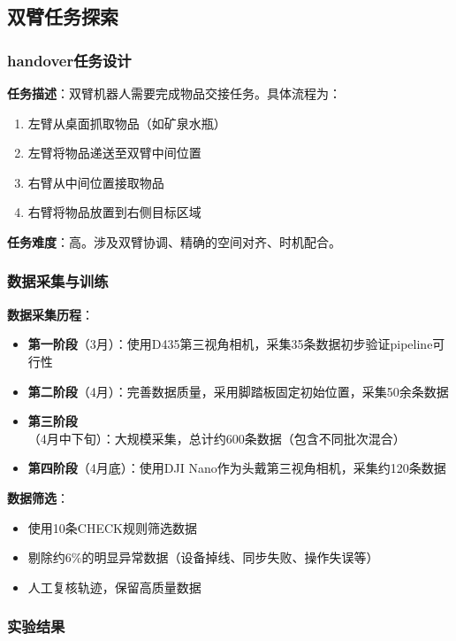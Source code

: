 \subsection{双臂任务探索}

\subsubsection{handover任务设计}

\textbf{任务描述}：双臂机器人需要完成物品交接任务。具体流程为：
\begin{enumerate}[leftmargin=2em]
    \item 左臂从桌面抓取物品（如矿泉水瓶）
    \item 左臂将物品递送至双臂中间位置
    \item 右臂从中间位置接取物品
    \item 右臂将物品放置到右侧目标区域
\end{enumerate}

\textbf{任务难度}：高。涉及双臂协调、精确的空间对齐、时机配合。

\subsubsection{数据采集与训练}

\textbf{数据采集历程}：
\begin{itemize}[leftmargin=2em]
    \item \textbf{第一阶段}（3月）：使用D435第三视角相机，采集35条数据初步验证pipeline可行性
    \item \textbf{第二阶段}（4月）：完善数据质量，采用脚踏板固定初始位置，采集50余条数据
    \item \textbf{第三阶段}（4月中下旬）：大规模采集，总计约600条数据（包含不同批次混合）
    \item \textbf{第四阶段}（4月底）：使用DJI Nano作为头戴第三视角相机，采集约120条数据
\end{itemize}

\textbf{数据筛选}：
\begin{itemize}[leftmargin=2em]
    \item 使用10条CHECK规则筛选数据
    \item 剔除约6\%的明显异常数据（设备掉线、同步失败、操作失误等）
    \item 人工复核轨迹，保留高质量数据
\end{itemize}

\subsubsection{实验结果}

